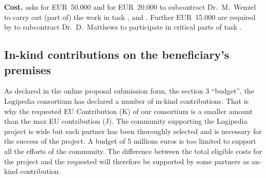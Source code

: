 {\bf Cost.}  asks for
EUR~50.000 and  for EUR~20.000 to subcontract Dr.\ M.\ Wenzel to
carry out (part of) the work in task
,  and
. Further EUR~15.000 are required
by  to subcontract Dr.\ D.\ Matthews to participate in
critical parts of task .

\subsection{In-kind contributions on the beneficiary’s premises}

As declared in the online proposal submission form, the section 3
``budget'', the Logipedia consortium has declared a number of in-kind
contributions. That is why the requested EU Contribution (K) of our
consortium is a smaller amount than the max EU contribution (J). The
community supporting the Logipedia project is wide but each partner
has been thoroughly selected and is necessary for the success of the
project. A budget of 5 millions euros is too limited to support all
the efforts of the community. The difference between the total
eligible costs for the project and the requested will therefore be
supported by some partners as an-kind contribution.

